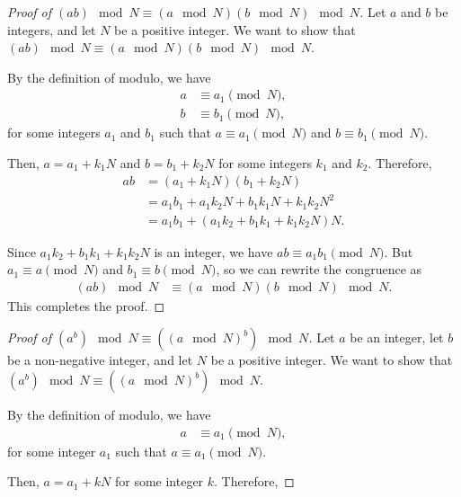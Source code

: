 \documentclass[12pt,openany]{book}
\begin{document}
	\newpage
	\begin{proof}[Proof of $(ab) \mod N \equiv (a \mod N)(b \mod N) \mod N$]
		Let $a$ and $b$ be integers, and let $N$ be a positive integer. We want to show that $(ab) \mod N \equiv (a \mod N)(b \mod N) \mod N$.
		
		By the definition of modulo, we have
		\begin{align*}
		a &\equiv a_1 \pmod{N}, \\
		b &\equiv b_1 \pmod{N},
		\end{align*}
		for some integers $a_1$ and $b_1$ such that $a \equiv a_1 \pmod{N}$ and $b \equiv b_1 \pmod{N}$.
		
		Then, $a = a_1 + k_1N$ and $b = b_1 + k_2N$ for some integers $k_1$ and $k_2$. Therefore,
		\begin{align*}
		ab &= (a_1 + k_1N)(b_1 + k_2N) \\
		&= a_1b_1 + a_1k_2N + b_1k_1N + k_1k_2N^2 \\
		&= a_1b_1 + (a_1k_2 + b_1k_1 + k_1k_2N)N.
		\end{align*}
		
		Since $a_1k_2 + b_1k_1 + k_1k_2N$ is an integer, we have $ab \equiv a_1b_1 \pmod{N}$. But $a_1 \equiv a \pmod{N}$ and $b_1 \equiv b \pmod{N}$, so we can rewrite the congruence as
		\begin{align*}
		(ab) \mod N &\equiv (a \mod N)(b \mod N) \mod N.
		\end{align*}
		This completes the proof.
	\end{proof}
	
	\begin{proof}[Proof of $(a^b) \mod N \equiv ((a \mod N)^b) \mod N$]
		Let $a$ be an integer, let $b$ be a non-negative integer, and let $N$ be a positive integer. We want to show that $(a^b) \mod N \equiv ((a \mod N)^b) \mod N$.
		
		By the definition of modulo, we have
		\begin{align*}
		a &\equiv a_1 \pmod{N},
		\end{align*}
		for some integer $a_1$ such that $a \equiv a_1 \pmod{N}$.
		
		Then, $a = a_1 + kN$ for some integer $k$. Therefore,
	\end{proof}
\end{document}
